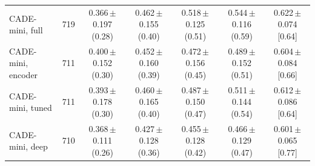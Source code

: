 \begin{table}[t]
{\begin{tabular}{@{}lrccccc@{}}
    \midrule
    CADE-mini, full & 719 & 0.366\,{\scriptsize$\pm$0.197} {\scriptsize(0.28)} & 0.462\,{\scriptsize$\pm$0.155} {\scriptsize(0.40)} & 0.518\,{\scriptsize$\pm$0.125} {\scriptsize(0.51)} & 0.544\,{\scriptsize$\pm$0.116} {\scriptsize(0.59)} & 0.622\,{\scriptsize$\pm$0.074} {\scriptsize[0.64]} \\
    CADE-mini, encoder & 711 & 0.400\,{\scriptsize$\pm$0.152} {\scriptsize(0.30)} & 0.452\,{\scriptsize$\pm$0.160} {\scriptsize(0.39)} & 0.472\,{\scriptsize$\pm$0.156} {\scriptsize(0.45)} & 0.489\,{\scriptsize$\pm$0.152} {\scriptsize(0.51)} & 0.604\,{\scriptsize$\pm$0.084} {\scriptsize[0.66]} \\
    CADE-mini, tuned & 711 & 0.393\,{\scriptsize$\pm$0.178} {\scriptsize(0.30)} & 0.460\,{\scriptsize$\pm$0.165} {\scriptsize(0.40)} & 0.487\,{\scriptsize$\pm$0.150} {\scriptsize(0.47)} & 0.511\,{\scriptsize$\pm$0.144} {\scriptsize(0.54)} & 0.612\,{\scriptsize$\pm$0.086} {\scriptsize[0.64]} \\
    CADE-mini, deep & 710 & 0.368\,{\scriptsize$\pm$0.111} {\scriptsize(0.26)} & 0.427\,{\scriptsize$\pm$0.128} {\scriptsize(0.36)} & 0.455\,{\scriptsize$\pm$0.128} {\scriptsize(0.42)} & 0.466\,{\scriptsize$\pm$0.129} {\scriptsize(0.47)} & 0.601\,{\scriptsize$\pm$0.065} {\scriptsize[0.77]} \\
    \bottomrule
  \end{tabular}}
\end{table}

